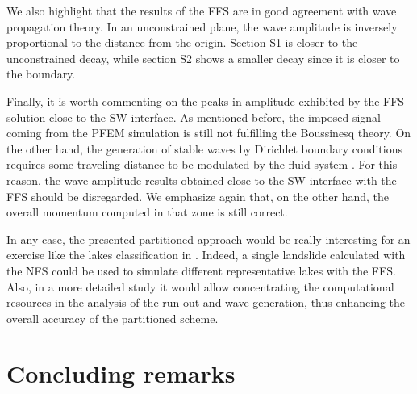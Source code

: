 We also highlight that the results of the FFS are in good agreement with wave propagation theory. In an unconstrained plane, the wave amplitude is inversely proportional to the distance from the origin. Section S1 is closer to the unconstrained decay, while section S2 shows a smaller decay since it is closer to the boundary.

Finally, it is worth commenting on the peaks in amplitude exhibited by the FFS solution close to the SW interface. As mentioned before, the imposed signal coming from the PFEM simulation is still not fulfilling the Boussinesq theory. On the other hand, the generation of stable waves by Dirichlet boundary conditions requires some traveling distance to be modulated by the fluid system \cite{wu2018}. For this reason, the wave amplitude results obtained close to the SW interface with the FFS should be disregarded. We emphasize again that, on the other hand, the overall momentum computed in that zone is still correct.

In any case, the presented partitioned approach would be really interesting for an exercise like the lakes classification in \cite{app112411614}. Indeed, a single landslide calculated with the NFS could be used to simulate different representative lakes with the FFS. Also, in a more detailed study it would allow concentrating the computational resources in the analysis of the run-out and wave generation, thus enhancing the overall accuracy of the partitioned scheme.



\section{Concluding remarks}


